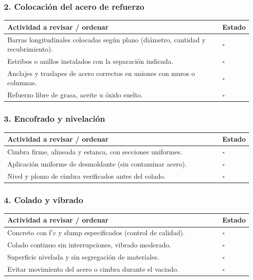 \documentclass[12pt]{article}
\newcommand{\cbox}{\(\square\)} %
\begin{document}
	\subsubsection*{2. Colocación del acero de refuerzo}
	\begin{tabularx}{\linewidth}{>{\raggedright\arraybackslash}p{0.93\linewidth} >{\centering\arraybackslash}m{0.07\linewidth}}
		\toprule
		\textbf{Actividad a revisar / ordenar} & \textbf{Estado}\\
		\midrule
		Barras longitudinales colocadas según plano (diámetro, cantidad y recubrimiento). & \cbox \\
		Estribos o anillos instalados con la separación indicada. & \cbox \\
		Anclajes y traslapes de acero correctos en uniones con muros o columnas. & \cbox \\
		Refuerzo libre de grasa, aceite u óxido suelto. & \cbox \\
		\bottomrule
	\end{tabularx}
	
	\subsubsection*{3. Encofrado y nivelación}
	\begin{tabularx}{\linewidth}{>{\raggedright\arraybackslash}p{0.93\linewidth} >{\centering\arraybackslash}m{0.07\linewidth}}
		\toprule
		\textbf{Actividad a revisar / ordenar} & \textbf{Estado}\\
		\midrule
		Cimbra firme, alineada y estanca, con secciones uniformes. & \cbox \\
		Aplicación uniforme de desmoldante (sin contaminar acero). & \cbox \\
		Nivel y plomo de cimbra verificados antes del colado. & \cbox \\
		\bottomrule
	\end{tabularx}
	
	\subsubsection*{4. Colado y vibrado}
	\begin{tabularx}{\linewidth}{>{\raggedright\arraybackslash}p{0.93\linewidth} >{\centering\arraybackslash}m{0.07\linewidth}}
		\toprule
		\textbf{Actividad a revisar / ordenar} & \textbf{Estado}\\
		\midrule
		Concreto con f’c y slump especificados (control de calidad). & \cbox \\
		Colado continuo sin interrupciones, vibrado moderado. & \cbox \\
		Superficie nivelada y sin segregación de materiales. & \cbox \\
		Evitar movimiento del acero o cimbra durante el vaciado. & \cbox \\
		\bottomrule
	\end{tabularx}
	
\end{document}
